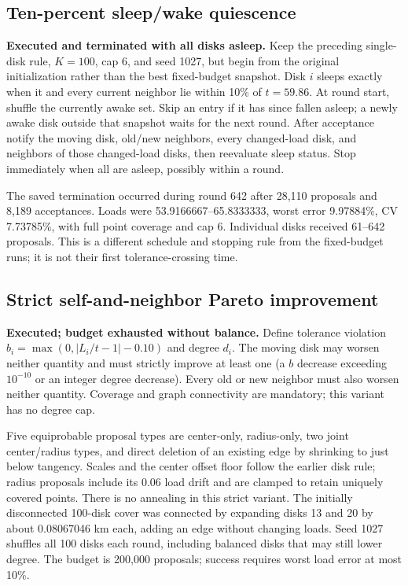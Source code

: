 \documentclass[11pt]{article}
\begin{document}
\subsection{Ten-percent sleep/wake quiescence}
\textbf{Executed and terminated with all disks asleep.}
Keep the preceding single-disk rule, $K=100$, cap 6, and seed 1027, but begin
from the original initialization rather than the best fixed-budget snapshot.
Disk $i$ sleeps exactly when it and every current neighbor lie within 10\% of
$t=59.86$. At round start, shuffle the currently awake set. Skip an entry if it
has since fallen asleep; a newly awake disk outside that snapshot waits for the
next round. After acceptance notify the moving disk, old/new neighbors, every
changed-load disk, and neighbors of those changed-load disks, then reevaluate
sleep status. Stop immediately when all are asleep, possibly within a round.

The saved termination occurred during round 642 after 28,110 proposals and
8,189 acceptances. Loads were 53.9166667--65.8333333, worst error 9.97884\%,
CV 7.73785\%, with full point coverage and cap 6. Individual disks received
61--642 proposals. This is a different schedule and stopping rule from the
fixed-budget runs; it is not their first tolerance-crossing time.

\subsection{Strict self-and-neighbor Pareto improvement}
\label{sec:pareto}
\textbf{Executed; budget exhausted without balance.}
Define tolerance violation $b_i=\max(0,|L_i/t-1|-0.10)$ and degree $d_i$.
The moving disk may worsen neither quantity and must strictly improve at least
one (a $b$ decrease exceeding $10^{-10}$ or an integer degree decrease).
Every old or new neighbor must also worsen neither quantity. Coverage and graph
connectivity are mandatory; this variant has no degree cap.

Five equiprobable proposal types are center-only, radius-only, two joint
center/radius types, and direct deletion of an existing edge by shrinking to
just below tangency. Scales and the center offset floor follow the earlier disk
rule; radius proposals include its 0.06 load drift and are clamped to retain
uniquely covered points. There is no annealing in this strict variant.
The initially disconnected 100-disk cover was connected by expanding disks
13 and 20 by about 0.08067046 km each, adding an edge without changing loads.
Seed 1027 shuffles all 100 disks each round, including balanced disks that may
still lower degree. The budget is 200,000 proposals; success requires worst
load error at most 10\%.
\end{document}
